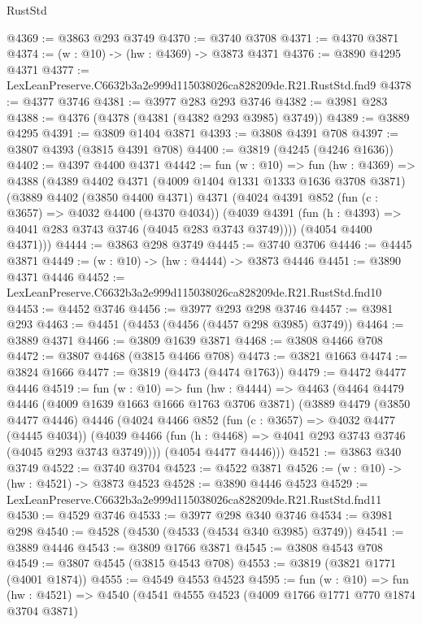 \begin{lexlean}{RustStd}
\begin{coremodule}
@4369 := @3863 @293 @3749
@4370 := @3740 @3708
@4371 := @4370 @3871
@4374 := (w : @10) -> (hw : @4369) -> @3873 @4371
@4376 := @3890 @4295 @4371
@4377 := LexLeanPreserve.C6632b3a2e999d115038026ca828209de.R21.RustStd.fnd9
@4378 := @4377 @3746
@4381 := @3977 @283 @293 @3746
@4382 := @3981 @283
@4388 := @4376 (@4378 (@4381 (@4382 @293 @3985) @3749))
@4389 := @3889 @4295
@4391 := @3809 @1404 @3871
@4393 := @3808 @4391 @708
@4397 := @3807 @4393 (@3815 @4391 @708)
@4400 := @3819 (@4245 (@4246 @1636))
@4402 := @4397 @4400 @4371
@4442 := fun (w : @10) =>
  fun (hw : @4369) =>
  @4388
    (@4389
      @4402
      @4371
      (@4009 @1404 @1331 @1333 @1636 @3708 @3871)
      (@3889
        @4402
        (@3850 @4400 @4371)
        @4371
        (@4024
          @4391
          @852
          (fun (c : @3657) => @4032 @4400 (@4370 @4034))
          (@4039 @4391 (fun (h : @4393) => @4041 @283 @3743 @3746 (@4045 @283 @3743 @3749))))
        (@4054 @4400 @4371)))
@4444 := @3863 @298 @3749
@4445 := @3740 @3706
@4446 := @4445 @3871
@4449 := (w : @10) -> (hw : @4444) -> @3873 @4446
@4451 := @3890 @4371 @4446
@4452 := LexLeanPreserve.C6632b3a2e999d115038026ca828209de.R21.RustStd.fnd10
@4453 := @4452 @3746
@4456 := @3977 @293 @298 @3746
@4457 := @3981 @293
@4463 := @4451 (@4453 (@4456 (@4457 @298 @3985) @3749))
@4464 := @3889 @4371
@4466 := @3809 @1639 @3871
@4468 := @3808 @4466 @708
@4472 := @3807 @4468 (@3815 @4466 @708)
@4473 := @3821 @1663
@4474 := @3824 @1666
@4477 := @3819 (@4473 (@4474 @1763))
@4479 := @4472 @4477 @4446
@4519 := fun (w : @10) =>
  fun (hw : @4444) =>
  @4463
    (@4464
      @4479
      @4446
      (@4009 @1639 @1663 @1666 @1763 @3706 @3871)
      (@3889
        @4479
        (@3850 @4477 @4446)
        @4446
        (@4024
          @4466
          @852
          (fun (c : @3657) => @4032 @4477 (@4445 @4034))
          (@4039 @4466 (fun (h : @4468) => @4041 @293 @3743 @3746 (@4045 @293 @3743 @3749))))
        (@4054 @4477 @4446)))
@4521 := @3863 @340 @3749
@4522 := @3740 @3704
@4523 := @4522 @3871
@4526 := (w : @10) -> (hw : @4521) -> @3873 @4523
@4528 := @3890 @4446 @4523
@4529 := LexLeanPreserve.C6632b3a2e999d115038026ca828209de.R21.RustStd.fnd11
@4530 := @4529 @3746
@4533 := @3977 @298 @340 @3746
@4534 := @3981 @298
@4540 := @4528 (@4530 (@4533 (@4534 @340 @3985) @3749))
@4541 := @3889 @4446
@4543 := @3809 @1766 @3871
@4545 := @3808 @4543 @708
@4549 := @3807 @4545 (@3815 @4543 @708)
@4553 := @3819 (@3821 @1771 (@4001 @1874))
@4555 := @4549 @4553 @4523
@4595 := fun (w : @10) =>
  fun (hw : @4521) =>
  @4540
    (@4541
      @4555
      @4523
      (@4009 @1766 @1771 @770 @1874 @3704 @3871)

\end{coremodule}
\end{lexlean}
